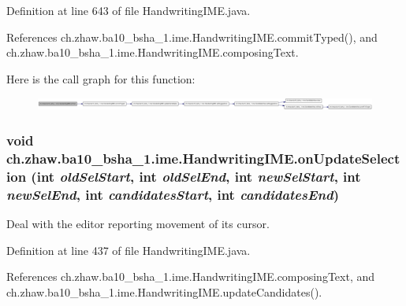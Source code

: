 Definition at line 643 of file HandwritingIME.java.

References ch.zhaw.ba10\_\-bsha\_\-1.ime.HandwritingIME.commitTyped(), and ch.zhaw.ba10\_\-bsha\_\-1.ime.HandwritingIME.composingText.

Here is the call graph for this function:\nopagebreak
\begin{figure}[H]
\begin{center}
\leavevmode
\includegraphics[width=420pt]{classch_1_1zhaw_1_1ba10__bsha__1_1_1ime_1_1HandwritingIME_aaa0fc01a36b17c423c223f0dce23390d_cgraph}
\end{center}
\end{figure}
\hypertarget{classch_1_1zhaw_1_1ba10__bsha__1_1_1ime_1_1HandwritingIME_a372883c8da0f8e41f6acb0d169fc5b6e}{
\subsubsection[{onUpdateSelection}]{\setlength{\rightskip}{0pt plus 5cm}void ch.zhaw.ba10\_\-bsha\_\-1.ime.HandwritingIME.onUpdateSelection (int {\em oldSelStart}, \/  int {\em oldSelEnd}, \/  int {\em newSelStart}, \/  int {\em newSelEnd}, \/  int {\em candidatesStart}, \/  int {\em candidatesEnd})}}
\label{classch_1_1zhaw_1_1ba10__bsha__1_1_1ime_1_1HandwritingIME_a372883c8da0f8e41f6acb0d169fc5b6e}
Deal with the editor reporting movement of its cursor. 

Definition at line 437 of file HandwritingIME.java.

References ch.zhaw.ba10\_\-bsha\_\-1.ime.HandwritingIME.composingText, and ch.zhaw.ba10\_\-bsha\_\-1.ime.HandwritingIME.updateCandidates().

